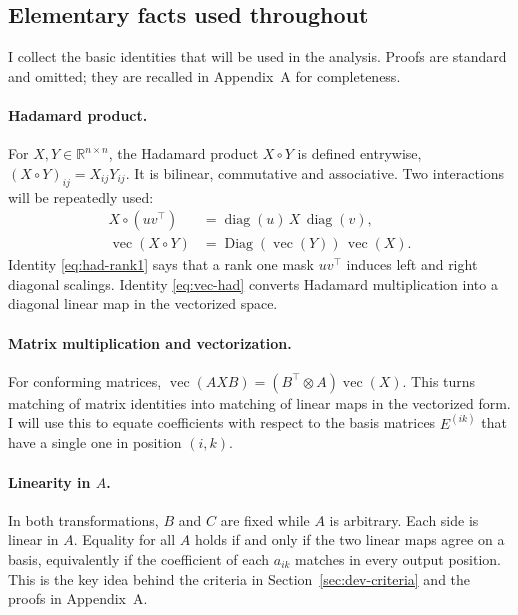 \documentclass[11pt,a4paper]{article}
\theoremstyle{definition}
\newcommand{\R}{\mathbb{R}}
\newcommand{\Had}{\circ}
\newcommand{\diag}{\operatorname{diag}}
\newcommand{\Diag}{\operatorname{Diag}}
\newcommand{\vecop}{\operatorname{vec}}
\begin{document}
\subsection{Elementary facts used throughout}
I collect the basic identities that will be used in the analysis. Proofs are standard and omitted; they are recalled in Appendix~A for completeness.

\paragraph{Hadamard product.}
For $X,Y\in\R^{n\times n}$, the Hadamard product $X\Had Y$ is defined entrywise, $(X\Had Y)_{ij}=X_{ij}Y_{ij}$. It is bilinear, commutative and associative. Two interactions will be repeatedly used:
\begin{align}
X \Had (u v^\top) &= \diag(u)\,X\,\diag(v), \label{eq:had-rank1}\\
\vecop(X\Had Y) &= \Diag(\vecop(Y))\,\vecop(X). \label{eq:vec-had}
\end{align}
Identity \eqref{eq:had-rank1} says that a rank one mask $uv^\top$ induces left and right diagonal scalings. Identity \eqref{eq:vec-had} converts Hadamard multiplication into a diagonal linear map in the vectorized space.

\paragraph{Matrix multiplication and vectorization.}
For conforming matrices, $\vecop(AXB)=(B^\top\!\otimes A)\vecop(X)$. This turns matching of matrix identities into matching of linear maps in the vectorized form. I will use this to equate coefficients with respect to the basis matrices $E^{(ik)}$ that have a single one in position $(i,k)$.

\paragraph{Linearity in $A$.}
In both transformations, $B$ and $C$ are fixed while $A$ is arbitrary. Each side is linear in $A$. Equality for all $A$ holds if and only if the two linear maps agree on a basis, equivalently if the coefficient of each $a_{ik}$ matches in every output position. This is the key idea behind the criteria in Section~\ref{sec:dev-criteria} and the proofs in Appendix~A.
\end{document}
